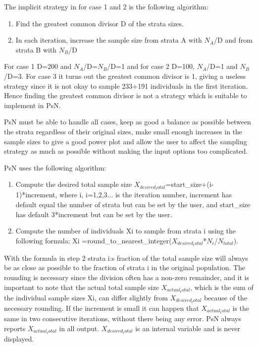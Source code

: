The implicit strategy in for case 1 and 2 is the following algorithm: 

\begin{enumerate}
	\item Find the greatest common divisor D of the strata sizes.
	\item In each iteration, increase the sample size from strata A with $N_A$/D and from strata B with $N_B$/D
\end{enumerate}
For case 1 D=200 and $N_A$/D=$N_B$/D=1 and for case 2 D=100, $N_A$/D=1 and $N_B$/D=3. For case 3 it turns out the greatest common divisor is 1, giving a useless strategy since it is not okay to sample 233+191 individuals in the first iteration. Hence finding the greatest common divisor is not a strategy which is suitable to implement in PsN.

PsN must be able to handle all cases, keep as good a balance as possible between the strata regardless of their original sizes, make small enough increases in the sample sizes to give a good power plot and allow the user to affect the sampling strategy as much as possible without making the input options too complicated.

PsN uses the following algorithm:
\begin{enumerate}
	\item Compute the desired total sample size $X_{desired_total}$=start\_size+(i-1)*increment, where i, i=1,2,3... 	is the iteration number, increment has default equal the number of strata but can be set by the 	user, and start\_size has default 3*increment but can be set by the user.
	\item Compute the number of individuals Xi to sample from strata i using the following formula: 	Xi =round\_to\_nearest\_integer($X_{desired_total}$*$N_i$/$N_{total}$). 
\end{enumerate}
With the formula in step 2 strata i:s fraction of the total sample size will always be as close as possible to the fraction of strata i in the original population. The rounding is necessary since the division often has a non-zero remainder, and it is important to note that the actual total sample size $X_{actual_total}$, which is the sum of the individual sample sizes Xi, can differ slightly from $X_{desired_total}$ because of the necessary rounding. If the increment is small it can happen that $X_{actual_total}$ is the same in two consecutive iterations, without there being any error. PsN always reports $X_{actual_total}$ in all output. $X_{desired_total}$ is an internal variable and is never displayed.

